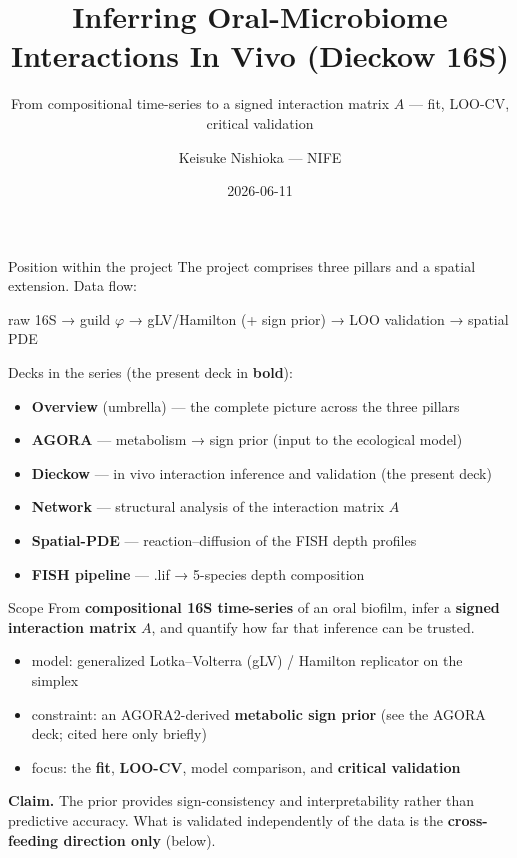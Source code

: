 \documentclass[
  ignorenonframetext,
  aspectratio=169,
]{beamer}
\title{Inferring Oral-Microbiome Interactions In Vivo (Dieckow 16S)}
\subtitle{From compositional time-series to a signed interaction matrix
\(A\) --- fit, LOO-CV, critical validation}
\author{Keisuke Nishioka --- NIFE}
\date{2026-06-11}
\providecommand{\tightlist}{%
  \setlength{\itemsep}{0pt}\setlength{\parskip}{0pt}}
\begin{document}
\frame{\titlepage}

\begin{frame}{Position within the project}
\protect\hypertarget{position-within-the-project}{}
The project comprises three pillars and a spatial extension. Data flow:

raw 16S → guild \(\varphi\) → gLV/Hamilton (+ sign prior) → LOO
validation → spatial PDE

Decks in the series (the present deck in \textbf{bold}):

\begin{itemize}
\tightlist
\item
  \textbf{Overview} (umbrella) --- the complete picture across the three
  pillars
\item
  \textbf{AGORA} --- metabolism → sign prior (input to the ecological
  model)
\item
  \textbf{Dieckow} --- in vivo interaction inference and validation (the
  present deck)
\item
  \textbf{Network} --- structural analysis of the interaction matrix
  \(A\)
\item
  \textbf{Spatial-PDE} --- reaction--diffusion of the FISH depth
  profiles
\item
  \textbf{FISH pipeline} --- .lif → 5-species depth composition
\end{itemize}
\end{frame}

\begin{frame}{Scope}
\protect\hypertarget{scope}{}
From \textbf{compositional 16S time-series} of an oral biofilm, infer a
\textbf{signed interaction matrix} \(A\), and quantify how far that
inference can be trusted.

\begin{itemize}
\tightlist
\item
  model: generalized Lotka--Volterra (gLV) / Hamilton replicator on the
  simplex
\item
  constraint: an AGORA2-derived \textbf{metabolic sign prior} (see the
  AGORA deck; cited here only briefly)
\item
  focus: the \textbf{fit}, \textbf{LOO-CV}, model comparison, and
  \textbf{critical validation}
\end{itemize}

\vspace{0.4em}

\textbf{Claim.} The prior provides sign-consistency and interpretability
rather than predictive accuracy. What is validated independently of the
data is the \textbf{cross-feeding direction only} (below).
\end{frame}
\end{document}
